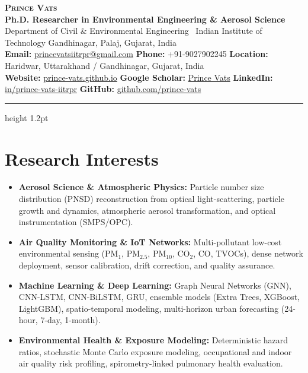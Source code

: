 \documentclass[10pt,a4paper]{article}
\begin{document}
\thispagestyle{firstpage}

\begin{center}
    {\LARGE \textbf{\textsc{Prince Vats}}}\\[3pt]
    {\small\textbf{Ph.D. Researcher in Environmental Engineering \& Aerosol Science}}\\[2pt]
    {\footnotesize Department of Civil \& Environmental Engineering \textbar\ Indian Institute of Technology Gandhinagar, Palaj, Gujarat, India}\\[3pt]
    {\footnotesize
        \textbf{Email:} \href{mailto:princevatsiitrpr@gmail.com}{princevatsiitrpr@gmail.com} \quad\textbar\quad
        \textbf{Phone:} +91-9027902245 \quad\textbar\quad
        \textbf{Location:} Haridwar, Uttarakhand / Gandhinagar, Gujarat, India\\[2pt]
        \textbf{Website:} \href{https://prince-vats.github.io}{prince-vats.github.io} \quad\textbar\quad
        \textbf{Google Scholar:} \href{https://scholar.google.com/citations?user=SPHQZR8AAAAJ&hl=en}{Prince Vats} \quad\textbar\quad
        \textbf{LinkedIn:} \href{https://www.linkedin.com/in/prince-vats-iitrpr/}{in/prince-vats-iitrpr} \quad\textbar\quad
        \textbf{GitHub:} \href{https://github.com/prince-vats}{github.com/prince-vats}
    }
\end{center}
\vspace{-4pt}
\hrule height 1.2pt
\vspace{4pt}

\section{Research Interests}
\begin{itemize}
    \item \textbf{Aerosol Science \& Atmospheric Physics:} Particle number size distribution (PNSD) reconstruction from optical light-scattering, particle growth and dynamics, atmospheric aerosol transformation, and optical instrumentation (SMPS/OPC).
    \item \textbf{Air Quality Monitoring \& IoT Networks:} Multi-pollutant low-cost environmental sensing (PM$_{1}$, PM$_{2.5}$, PM$_{10}$, CO$_{2}$, CO, TVOCs), dense network deployment, sensor calibration, drift correction, and quality assurance.
    \item \textbf{Machine Learning \& Deep Learning:} Graph Neural Networks (GNN), CNN-LSTM, CNN-BiLSTM, GRU, ensemble models (Extra Trees, XGBoost, LightGBM), spatio-temporal modeling, multi-horizon urban forecasting (24-hour, 7-day, 1-month).
    \item \textbf{Environmental Health \& Exposure Modeling:} Deterministic hazard ratios, stochastic Monte Carlo exposure modeling, occupational and indoor air quality risk profiling, spirometry-linked pulmonary health evaluation.
\end{itemize}
\end{document}
